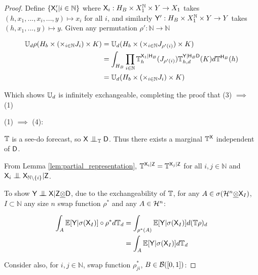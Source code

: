 \begin{proof}
Define $\{\mathsf{X}'_i|i\in \mathbb{N}\}$ where $\mathsf{X}_i:H_B\times X_1^{\mathbb{N}}\times Y\to X_1$ takes $(h,x_1,...,x_i,...,y)\mapsto x_i$ for all $i$, and similarly $\mathsf{Y}':H_B\times X_1^{\mathbb{N}}\times Y\to Y$ takes $(h, x_1,...,y)\mapsto y$. Given any permutation $\rho':\mathbb{N}\to\mathbb{N}$

\begin{align}
    \mathbb{U}_d\rho(H_b \times (\times_{i\in \mathbb{N}}J_{i})\times K)&= \mathbb{U}_d(H_b \times (\times_{i\in \mathbb{N}}J_{\rho'(i)})\times K)\\
    &= \int_{H_B} \prod_{i\in \mathbb{N}} \mathbb{T}^{\mathsf{X}_1|\mathsf{H}_B}_h(J_{\rho'(i)}) \mathbb{T}_{h,d}^{\mathsf{Y}|\mathsf{H}_B\mathsf{D}}(K)d\mathbb{T}^{\mathsf{H}_B}(h)\\
    &= \mathbb{U}_d(H_b \times (\times_{i\in \mathbb{N}}J_{i})\times K)
\end{align}

Which shows $\mathbb{U}_d$ is infinitely exchangeable, completing the proof that (3) $\implies$ (1)


(1) $\implies$ (4):

$\mathbb{T}$ is a see-do forecast, so $\RV{X}\CI_{\kernel{T}}\RV{D}$. Thus there exists a marginal $\mathbb{T}^{\mathsf{X}}$ independent of $\mathsf{D}$.

From Lemma \ref{lem:partial_representation}, $\mathbb{T}^{\mathsf{X}_i|\mathsf{Z}}=\mathbb{T}^{\mathsf{X}_j|\mathsf{Z}}$ for all $i,j\in \mathbb{N}$ and $\RV{X}_i\CI\RV{X}_{\mathbb{N}\setminus\{i\}} |\RV{Z}$.

To show $\RV{Y}\CI\RV{X}|\RV{Z}\utimes\RV{D}$, due to the exchangeability of $\mathbb{T}$, for any $A\in \sigma(\mathcal{H}^n\underline{\otimes}\mathsf{X}_I)$, $I\subset\mathbb{N}$ any size $n$ swap function $\rho^*$ and any $A\in\mathcal{H}^n$:

\begin{align}
    \int_A \mathbb{E}[\mathsf{Y}|\sigma(\mathsf{X}_I)] \circ \rho^* d\mathbb{T}_d &= \int_{\rho^*(A)} \mathbb{E}[\mathsf{Y}|\sigma(\mathsf{X}_I)] d(\mathbb{T}\rho)_d\\
                                                                                       &= \int_A \mathbb{E}[\mathsf{Y}|\sigma(\mathsf{X}_I)] d\mathbb{T}_d
\end{align}

Consider also, for $i,j\in \mathbb{N}$, swap function $\rho^*_{ji}$, $B\in \mathcal{B}([0,1])$:


\end{proof}
